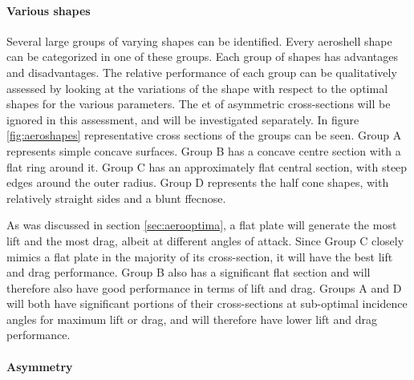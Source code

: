 \paragraph{Various shapes} \label{sec:aeroshapes}
Several large groups of varying shapes can be identified. Every aeroshell shape can be categorized in one of these groups.  Each group of shapes has advantages and disadvantages. The relative performance of each group can be qualitatively assessed by looking at the variations of the shape with respect to the optimal shapes for the various parameters. The et of asymmetric cross-sections will be ignored in this assessment, and will be investigated separately. In figure \ref{fig:aeroshapes} representative cross sections of the groups can be seen. Group A represents simple concave surfaces. Group B has a concave centre section with a flat ring around it. Group C has an approximately flat central section, with steep edges around the outer radius. Group D represents the half cone shapes, with relatively straight sides and a blunt ffecnose. 

As was discussed in section \ref{sec:aerooptima}, a flat plate will generate the most lift and the most drag, albeit at different angles of attack. Since Group C closely mimics a flat plate in the majority of its cross-section, it will have the best lift and drag performance. Group B also has a significant flat section and will therefore also have good performance in terms of lift and drag. Groups A and D will both have significant portions of their cross-sections at sub-optimal incidence angles for maximum lift or drag, and will therefore have lower lift and drag performance.



\paragraph{Asymmetry}
























